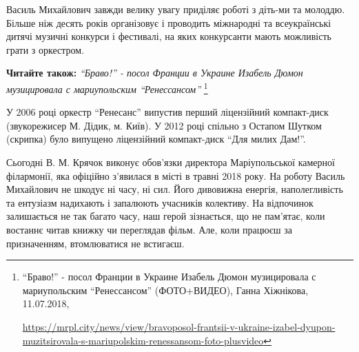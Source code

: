 Василь Михайлович завжди велику увагу приділяє роботі з діть\hyp{}ми та молоддю.
Більше ніж десять років організовує і проводить міжнародні та всеукраїнські
дитячі музичні конкурси і фестивалі, на яких конкурсанти мають можливість грати
з оркестром.

\textbf{Читайте також:} \emph{\enquote{Браво!} - посол Франции в Украине Изабель Дюмон музицировала с мариупольским \enquote{Ренессансом}}%
\footnote{\enquote{Браво!} - посол Франции в Украине Изабель Дюмон музицировала с мариупольским \enquote{Ренессансом} (ФОТО+ВИДЕО), Ганна Хіжнікова, 11.07.2018, \par\url{https://mrpl.city/news/view/bravoposol-frantsii-v-ukraine-izabel-dyupon-muzitsirovala-s-mariupolskim-renessansom-foto-plusvideo}}

У 2006 році оркестр \enquote{Ренесанс} випустив перший ліцензійний компакт-диск
(звукорежисер М. Дідик, м. Київ). У 2012 році спільно з Остапом Шутком
(скрипка) було випущено ліцензійний компакт-диск \enquote{Для милих Дам!}.


Сьогодні В. М. Крячок виконує обов'язки директора Маріупольської камерної
філармонії, яка офіційно з'явилася в місті в травні 2018 року. На роботу Василь
Михайлович не шкодує ні часу, ні сил. Його дивовижна енергія, наполегливість та
ентузіазм надихають і запалюють учасників колективу. На відпочинок залишається
не так багато часу, наш герой зізнається, що не пам'ятає, коли востаннє читав
книжку чи переглядав фільм. Але, коли працюєш за призначенням, втомлюватися не
встигаєш.

